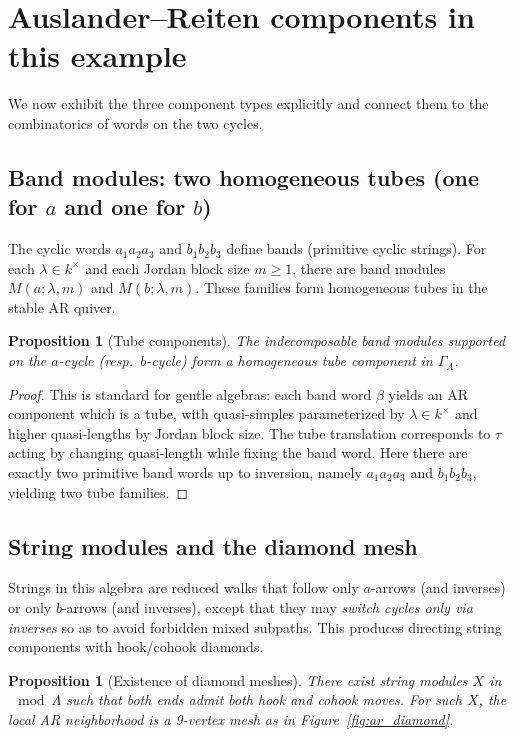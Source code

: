 \documentclass[11pt,oneside]{amsbook}
\numberwithin{equation}{section}
\theoremstyle{plain}
\newtheorem{proposition}[theorem]{Proposition}
\theoremstyle{definition}
\theoremstyle{remark}
\begin{document}
\section{Auslander--Reiten components in this example}
We now exhibit the three component types explicitly and connect them to the combinatorics of words on the two cycles.

\subsection{Band modules: two homogeneous tubes (one for $a$ and one for $b$)}
The cyclic words $a_1a_2a_3$ and $b_1b_2b_3$ define bands (primitive cyclic strings).
For each $\lambda\in k^\times$ and each Jordan block size $m\ge1$, there are band modules
$M(a;\lambda,m)$ and $M(b;\lambda,m)$.
These families form homogeneous tubes in the stable AR quiver.

\begin{proposition}[Tube components]
\label{prop:torus_tubes}
The indecomposable band modules supported on the $a$-cycle (resp.\ $b$-cycle) form a homogeneous tube component in $\Gamma_\Lambda$.
\end{proposition}

\begin{proof}
This is standard for gentle algebras: each band word $\beta$ yields an AR component which is a tube, with quasi-simples parameterized by $\lambda\in k^\times$
and higher quasi-lengths by Jordan block size. The tube translation corresponds to $\tau$ acting by changing quasi-length while fixing the band word.
Here there are exactly two primitive band words up to inversion, namely $a_1a_2a_3$ and $b_1b_2b_3$, yielding two tube families.
\end{proof}

\subsection{String modules and the diamond mesh}
Strings in this algebra are reduced walks that follow only $a$-arrows (and inverses) or only $b$-arrows (and inverses), except that they may \emph{switch cycles only via inverses}
so as to avoid forbidden mixed subpaths. This produces directing string components with hook/cohook diamonds.

\begin{proposition}[Existence of diamond meshes]
\label{prop:torus_diamond}
There exist string modules $X$ in $\mod\Lambda$ such that both ends admit both hook and cohook moves.
For such $X$, the local AR neighborhood is a 9-vertex mesh as in Figure~\ref{fig:ar_diamond}.
\end{proposition}
\end{document}
